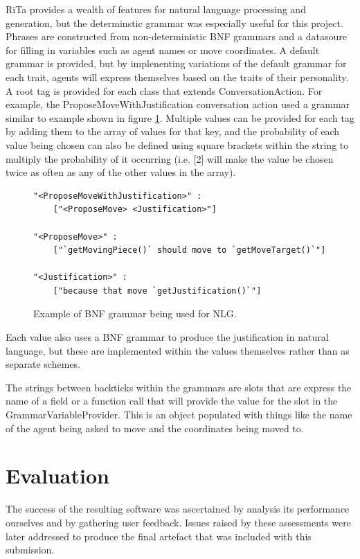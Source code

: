 \documentclass{article}
\begin{document}
RiTa provides a wealth of features for natural language processing and generation, but the determinstic grammar was especially useful for this project. Phrases are constructed from non-deterministic BNF grammars and a datasoure for filling in variables such as agent names or move coordinates. A default grammar is provided, but by implenenting variations of the default grammar for each trait, agents will express themselves based on the traits of their personality. A root tag is provided for each class that extends ConversationAction. For example, the ProposeMoveWithJustification conversation action used a grammar similar to example shown in figure \ref{fig:bnf}. Multiple values can be provided for each tag by adding them to the array of values for that key, and the probability of each value being chosen can also be defined using square brackets within the string to multiply the probability of it occurring (i.e. [2] will make the value be chosen twice as often as any of the other values in the array).

\begin{figure}
\begin{lstlisting}[breaklines=true, stringstyle=\color{mauve}]
"<ProposeMoveWithJustification>" : 
	["<ProposeMove> <Justification>"]

"<ProposeMove>" : 
	["`getMovingPiece()` should move to `getMoveTarget()`"]

"<Justification>" : 
	["because that move `getJustification()`"]
\end{lstlisting}
\caption{Example of BNF grammar being used for NLG.}
\label{fig:bnf}
\end{figure}

Each value also uses a BNF grammar to produce the justification in natural language, but these are implemented within the values themselves rather than as separate schemes.

The strings between backticks within the grammars are slots that are express the name of a field or a function call that will provide the value for the slot in the GrammarVariableProvider. This is an object populated with things like the name of the agent being asked to move and the coordinates being moved to.

\section{Evaluation}

The success of the resulting software was ascertained by analysis its performance ourselves and by gathering user feedback. Issues raised by these assessments were later addressed to produce the final artefact that was included with this submission.
\end{document}
